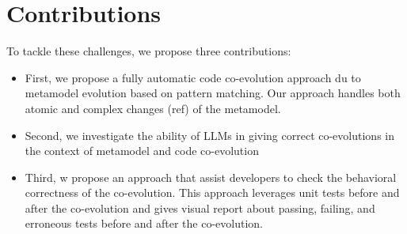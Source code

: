 \section*{Contributions}
To tackle these challenges, we propose three contributions:
\begin{itemize}
	\item First, we propose a fully automatic code co-evolution approach du to  metamodel evolution based on pattern matching. Our approach handles both atomic and complex changes (ref) of the metamodel.
	\item Second, we investigate the ability of LLMs in giving correct co-evolutions in the context of metamodel and code co-evolution
	
	\item Third, w propose an approach that assist developers to check the behavioral correctness of the co-evolution. This approach leverages unit tests before and after the co-evolution and gives visual report about passing, failing, and erroneous tests before and after the co-evolution.

\end{itemize}





